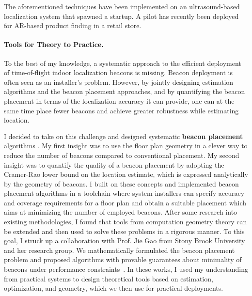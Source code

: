 \documentclass[10pt]{article}
\begin{document}
The aforementioned techniques have been implemented on an ultrasound-based localization system that spawned a startup. A pilot has recently been deployed for AR-based product finding in a retail store. 




\paragraph{Tools for Theory to Practice.  }
To the best of my knowledge, a systematic approach to the efficient deployment of time-of-flight indoor localization beacons is missing. 
Beacon deployment is often seen as an installer's problem. 
However, by jointly designing estimation algorithms and the beacon placement approaches, and by quantifying the beacon placement in terms of the localization accuracy it can provide, one can at the same time place fewer beacons and achieve greater robustness while estimating location.

I decided to take on this challenge and designed systematic {\bf beacon placement} algorithms \cite{rajagopal2016beacon}. 
My first insight was to use the floor plan geometry in a clever way to reduce the number of beacons compared to conventional placement. 
My second insight was to quantify the quality of a beacon placement by adopting the Cramer-Rao lower bound on the location estimate, which is expressed analytically by the geometry of beacons. I built on these concepts and implemented beacon placement algorithms in a toolchain where system installers can specify accuracy and coverage requirements for a floor plan and obtain a suitable placement which aims at minimizing the number of employed beacons.
After some research into existing methodologies, I found that tools from computation geometry theory can be extended and then used to solve these problems in a rigorous manner.  To this goal, I struck up a collaboration with Prof. Jie Gao from Stony Brook University and her research group. We mathematically formulated the beacon placement problem and proposed algorithms with provable guarantees about minimality of beacons under performance constraints~\cite{beaconplacementtheory}.  In these works, I used my understanding from practical systems to design theoretical tools based on estimation, optimization, and geometry, which we then use for practical deployments.
\end{document}
